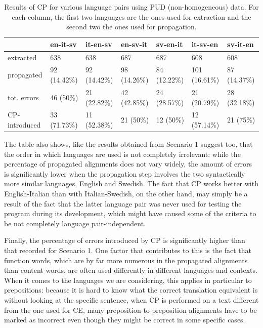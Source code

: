\begin{table}[H]
    \centering
    \scriptsize
    \begin{tabular}{|l|l|l|l|l|l|l|}
    \hline
    \textbf{}                     & \textbf{en-it-sv} & \textbf{it-en-sv} & \textbf{en-sv-it} & \textbf{sv-en-it} & \textbf{it-sv-en} & \textbf{sv-it-en} \\ \hline
    extracted   & 638               & 638               & 687               & 687               & 608               & 608               \\ \hline
    propagated                    & 92 (14.42\%)      & 92 (14.42\%)      & 98 (14.26\%)      & 84 (12.22\%)      & 101 (16.61\%)     & 87 (14.37\%)      \\ \hline
    tot. errors                   & 46 (50\%)         & 21 (22.82\%)      & 42 (42.85\%)      & 24 (28.57\%)      & 21 (20.79\%)      & 28 (32.18\%)      \\ \hline
    CP-introduced                 & 33 (71.73\%)      & 11 (52.38\%)      & 21 (50\%)         & 12 (50\%)         & 12 (57.14\%)      & 21 (75\%)         \\ \hline
    \end{tabular}
    \caption[Performance of CP Scenario 2 on manually annotated non-homogeneous data]{Results of CP for various language pairs using PUD (non-homogeneous) data. For each column, the first two languages are the ones used for extraction and the second two the ones used for propagation.}
    \label{tcp2pud}
    \end{table}

The table also shows, like the results obtained from Scenario 1 suggest too, that the order in which languages are used is not completely irrelevant: while the percentage of propagated alignments does not vary widely, the amount of errors is significantly lower when the propagation step involves the two syntactically more similar languages, English and Swedish. The fact that CP works better with English-Italian than with Italian-Swedish, on the other hand, may simply be a result of the fact that the latter language pair was never used for testing the program during its development, which might have caused some of the criteria to be not completely language pair-independent. \smallskip

Finally, the percentage of errors introduced by CP is significantly higher than that recorded for Scenario 1. One factor that contributes to this is the fact that function words, which are by far more numerous in the propagated alignments than content words, are often used differently in different languages and contexts. When it comes to the languages we are considering, this applies in particular to prepositions: because it is hard to know what the correct translation equivalent is without looking at the specific sentence, when CP is performed on a text different from the one used for CE, many preposition-to-preposition alignments have to be marked as incorrect even though they might be correct in some specific cases.

